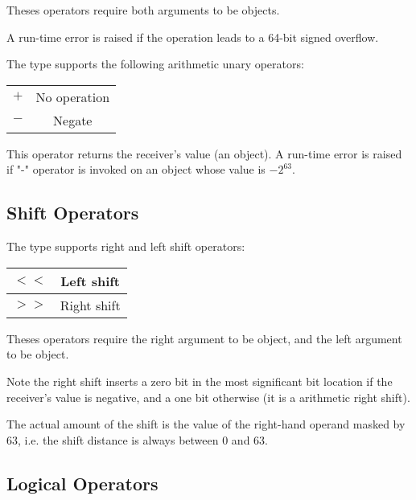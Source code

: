 Theses operators require both arguments to be  objects.\newline

A run-time error is raised if the operation leads to a 64-bit signed overflow.

The  type supports the following arithmetic unary operators:\newline

\begin{tabular}{|c|c|}
\hline
$+$ & No operation \\
$-$ & Negate \\
\hline
\end{tabular}\newline

This operator returns the receiver's value (an  object). A run-time error is raised if "-" operator is invoked on an object whose value is $-2^{63}$.






\subsection{Shift Operators}


The  type supports right and left shift operators:\newline

\begin{tabular}{|c|c|}
\hline
$<<$ & Left shift \\
\hline
$>>$ & Right shift \\
\hline
\end{tabular}\newline

Theses operators require the right argument to be  object, and the left argument to be  object.\newline

Note the right shift inserts a zero bit in the most significant bit location if the receiver's value is negative, and a one bit otherwise (it is a arithmetic right shift).\newline

The actual amount of the shift is the value of the right-hand operand masked by 63, i.e. the shift distance is always between 0 and 63.




\subsection{Logical Operators}

